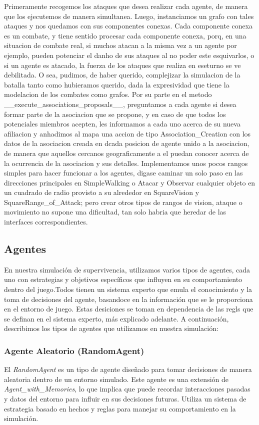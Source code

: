 \documentclass[11pt]{article}
\begin{document}
Primeramente recogemos los ataques que desea realizar cada agente, de manera que los ejecutemos de manera simultanea. Luego, instanciamos un grafo con tales ataques y nos quedamos con sus componentes conexas. Cada componente conexa es un combate, y tiene sentido procesar cada componente conexa, porq, en una situacion de combate real, si muchos atacan a la misma vez a un agente por ejemplo, pueden potenciar el danho de sus ataques al no poder este esquivarlos, o si un agente es atacado, la fuerza de los ataques que realiza en eseturno se ve debilitada. O sea, pudimos, de haber querido, complejizar la simulacion de la batalla tanto como hubieramos querido, dada la expresividad que tiene la modelacion de los combates como grafos.
Por su parte en el metodo __execute_associations_proposals__, preguntamos a cada agente si desea formar parte de la asociacion que se propone, y en caso de que todos los potenciales miembros acepten, les informamos a cada uno acerca de su nueva afiliacion y anhadimos al mapa una accion de tipo Association_Creation con los datos de la asociacion creada en dcada posicion de agente unido a la asociacion, de manera que aquellos cercanos geograficamente a el puedan conocer acerca de la ocurrencia de la asociacion y sus detalles.
Implementamos unos pocos rangos simples para hacer funcionar a los agentes, digase caminar un solo paso en las direcciones principales en SimpleWalking o Atacar y Observar cualquier objeto en un cuadrado de radio provisto a su alrededor en SquareVision y SquareRange_of_Attack; pero crear otros tipos de rangos de vision, ataque o movimiento no supone una dificultad, tan solo habria que heredar de las interfaces correspondientes.
\subsection{Agentes}
En nuestra simulación de supervivencia, utilizamos varios tipos de agentes, cada uno con estrategias y objetivos específicos que influyen en su comportamiento dentro del juego.Todos tienen un sistema experto que emula el conocimiento y la toma de decisiones del agente,
basandoce en la información que se le proporciona en el entorno de juego. Estas desiciones se toman en dependencia de las regls que se definan en el sistema experto, más explicado adelante. A continuación, describimos los tipos de agentes que utilizamos en nuestra simulación:

\subsubsection{Agente Aleatorio (RandomAgent)}
El \textit{RandomAgent} es un tipo de agente diseñado para tomar decisiones de manera aleatoria dentro de un entorno simulado. Este agente es una extensión de \textit{Agent\_with\_Memories}, lo que implica que puede recordar interacciones pasadas y datos del entorno para influir en sus decisiones futuras. Utiliza un sistema de estrategia basado en hechos y reglas para manejar su comportamiento en la simulación.
\end{document}
